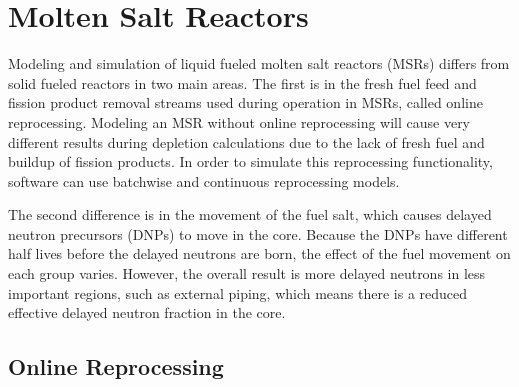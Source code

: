 
\renewcommand*\descriptionlabel[1]{\hspace\leftmargin$#1$}
\setcounter{tocdepth}{5}
\setcounter{secnumdepth}{5}


\section{Molten Salt Reactors}

Modeling and simulation of liquid fueled molten salt reactors (MSRs) differs from solid fueled reactors in two main areas. The first is in the fresh fuel feed and fission product removal streams used during operation in MSRs, called online reprocessing. Modeling an MSR without online reprocessing will cause very different results during depletion calculations due to the lack of fresh fuel and buildup of fission products. In order to simulate this reprocessing functionality, software can use batchwise and continuous reprocessing models.

The second difference is in the movement of the fuel salt, which causes delayed neutron precursors (DNPs) to move in the core. Because the DNPs have different half lives before the delayed neutrons are born, the effect of the fuel movement on each group varies. However, the overall result is more delayed neutrons in less important regions, such as external piping, which means there is a reduced effective delayed neutron fraction in the core.

\subsection{Online Reprocessing}

